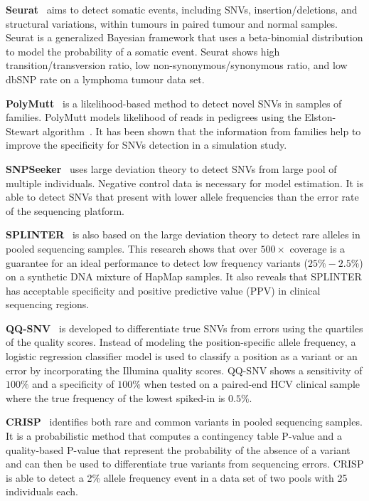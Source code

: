 \documentclass[a4,center,fleqn]{NAR}
\begin{document}
\textbf{Seurat}~\citep{Christoforides2013} aims to detect somatic events, including SNVs, insertion/deletions, and structural variations, within tumours in paired tumour and normal samples.
Seurat is a generalized Bayesian framework that uses a beta-binomial distribution to model the probability of a somatic event.
Seurat shows high transition/transversion ratio, low non-synonymous/synonymous ratio, and low dbSNP rate on a lymphoma tumour data set.

\textbf{PolyMutt}~\citep{li2012likelihood} is a likelihood-based method to detect novel SNVs in samples of families.
PolyMutt models likelihood of reads in pedigrees using the Elston-Stewart algorithm~\citep{elston1971general}.
It has been shown that the information from families help to improve the specificity for SNVs detection in a simulation study.

\textbf{SNPSeeker}~\citep{Druley2009} uses large deviation theory to detect SNVs from large pool of multiple individuals.
Negative control data is necessary for model estimation.
It is able to detect SNVs that present with lower allele frequencies than the error rate of the sequencing platform.

\textbf{SPLINTER}~\citep{Spencer2014} is also based on the large deviation theory to detect rare alleles in pooled sequencing samples.
This research shows that over $500 \times$ coverage is a guarantee for an ideal performance to detect low frequency variants ($25\% - 2.5\%$) on a synthetic DNA mixture of HapMap samples.
It also reveals that SPLINTER has acceptable specificity and positive predictive value (PPV) in clinical sequencing regions.

\textbf{QQ-SNV}~\citep{VanderBorght2015} is developed to differentiate true SNVs from errors using the quartiles of the quality scores.
Instead of modeling the position-specific allele frequency, a logistic regression classifier model is used to classify a position as a variant or an error by incorporating the Illumina quality scores.
QQ-SNV shows a sensitivity of $100\%$ and a specificity of $100\%$ when tested on a paired-end HCV clinical sample where the true frequency of the lowest spiked-in is $0.5\%$.


\textbf{CRISP}~\citep{Bansal2010} identifies both rare and common variants in pooled sequencing samples.
It is a probabilistic method that computes a contingency table P-value and a quality-based P-value that represent the probability of the absence of a variant and can then be used to differentiate true variants from sequencing errors.
CRISP is able to detect a 2\% allele frequency event in a data set of two pools with 25 individuals each.
\end{document}

